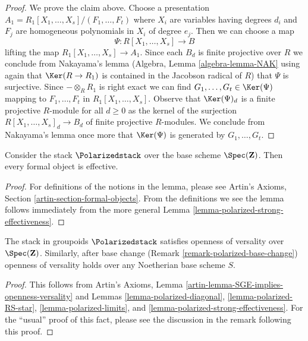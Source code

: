 \begin{proof}
\medskip\noindent
We prove the claim above.
Choose a presentation $A_1 = R_1[X_1, \ldots, X_s]/(F_1, \ldots, F_t)$
where $X_i$ are variables having degrees $d_i$ and $F_j$
are homogeneous polynomials in $X_i$ of degree $e_j$.
Then we can choose a map
$$
\Psi : R[X_1, \ldots, X_s] \longrightarrow B
$$
lifting the map $R_1[X_1, \ldots, X_s] \to A_1$. Since each $B_d$
is finite projective over $R$ we conclude from 
Nakayama's lemma (Algebra, Lemma \ref{algebra-lemma-NAK}
using again that $\Ker(R \to R_1)$ is contained in the Jacobson radical
of $R$) that $\Psi$ is surjective. Since $- \otimes_R R_1$ is right
exact we can find $G_1, \ldots, G_t \in \Ker(\Psi)$
mapping to $F_1, \ldots, F_t$ in $R_1[X_1, \ldots, X_s]$.
Observe that $\Ker(\Psi)_d$ is a finite projective $R$-module
for all $d \geq 0$ as the kernel of the surjection
$R[X_1, \ldots, X_s]_d \to B_d$ of finite projective $R$-modules.
We conclude from Nakayama's lemma once more that 
$\Ker(\Psi)$ is generated by $G_1, \ldots, G_t$.
\end{proof}

\begin{lemma}
\label{lemma-polarized-existence}
Consider the stack $\Polarizedstack$ over the base
scheme $\Spec(\mathbf{Z})$. Then every formal object is effective.
\end{lemma}

\begin{proof}
For definitions of the notions in the lemma, please see
Artin's Axioms, Section \ref{artin-section-formal-objects}.
From the definitions we see the lemma follows immediately
from the more general Lemma \ref{lemma-polarized-strong-effectiveness}.
\end{proof}

\begin{lemma}
\label{lemma-polarized-defo-thy}
The stack in groupoids $\Polarizedstack$
satisfies openness of versality over $\Spec(\mathbf{Z})$.
Similarly, after base change (Remark \ref{remark-polarized-base-change})
openness of versality holds over any Noetherian base scheme $S$.
\end{lemma}

\begin{proof}
This follows from
Artin's Axioms, Lemma \ref{artin-lemma-SGE-implies-openness-versality}
and Lemmas \ref{lemma-polarized-diagonal},
\ref{lemma-polarized-RS-star},
\ref{lemma-polarized-limits}, and
\ref{lemma-polarized-strong-effectiveness}.
For the ``usual'' proof of this fact, please see the discussion
in the remark following this proof.
\end{proof}

